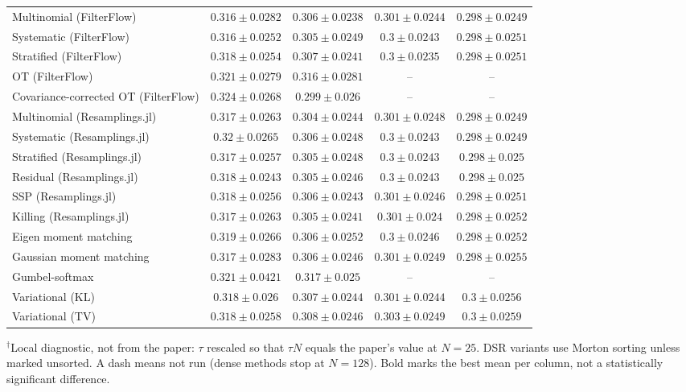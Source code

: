 \begin{table}[H]
\begin{adjustbox}{max width=\linewidth}
\begin{tabular}{lcccc}
Multinomial (FilterFlow) & $0.316\pm0.0282$ & $0.306\pm0.0238$ & $0.301\pm0.0244$ & $0.298\pm0.0249$ \\
Systematic (FilterFlow) & $0.316\pm0.0252$ & $0.305\pm0.0249$ & $0.3\pm0.0243$ & $0.298\pm0.0251$ \\
Stratified (FilterFlow) & $0.318\pm0.0254$ & $0.307\pm0.0241$ & $0.3\pm0.0235$ & $0.298\pm0.0251$ \\
OT (FilterFlow) & $0.321\pm0.0279$ & $0.316\pm0.0281$ & -- & -- \\
Covariance-corrected OT (FilterFlow) & $0.324\pm0.0268$ & $0.299\pm0.026$ & -- & -- \\
Multinomial (Resamplings.jl) & $0.317\pm0.0263$ & $0.304\pm0.0244$ & $0.301\pm0.0248$ & $0.298\pm0.0249$ \\
Systematic (Resamplings.jl) & $0.32\pm0.0265$ & $0.306\pm0.0248$ & $0.3\pm0.0243$ & $0.298\pm0.0249$ \\
Stratified (Resamplings.jl) & $0.317\pm0.0257$ & $0.305\pm0.0248$ & $0.3\pm0.0243$ & $0.298\pm0.025$ \\
Residual (Resamplings.jl) & $0.318\pm0.0243$ & $0.305\pm0.0246$ & $0.3\pm0.0243$ & $0.298\pm0.025$ \\
SSP (Resamplings.jl) & $0.318\pm0.0256$ & $0.306\pm0.0243$ & $0.301\pm0.0246$ & $0.298\pm0.0251$ \\
Killing (Resamplings.jl) & $0.317\pm0.0263$ & $0.305\pm0.0241$ & $0.301\pm0.024$ & $0.298\pm0.0252$ \\
Eigen moment matching & $0.319\pm0.0266$ & $0.306\pm0.0252$ & $0.3\pm0.0246$ & $0.298\pm0.0252$ \\
Gaussian moment matching & $0.317\pm0.0283$ & $0.306\pm0.0246$ & $0.301\pm0.0249$ & $0.298\pm0.0255$ \\
Gumbel-softmax & $0.321\pm0.0421$ & $0.317\pm0.025$ & -- & -- \\
Variational (KL) & $0.318\pm0.026$ & $0.307\pm0.0244$ & $0.301\pm0.0244$ & $0.3\pm0.0256$ \\
Variational (TV) & $0.318\pm0.0258$ & $0.308\pm0.0246$ & $0.303\pm0.0249$ & $0.3\pm0.0259$ \\
\bottomrule
\end{tabular}
\end{adjustbox}
\par\smallskip\parbox{0.95\linewidth}{\footnotesize $^\dagger$Local diagnostic, not from the paper: $\tau$ rescaled so that $\tau N$ equals the paper's value at $N{=}25$. DSR variants use Morton sorting unless marked unsorted. A dash means not run (dense methods stop at $N{=}128$). Bold marks the best mean per column, not a statistically significant difference.}
\end{table}

